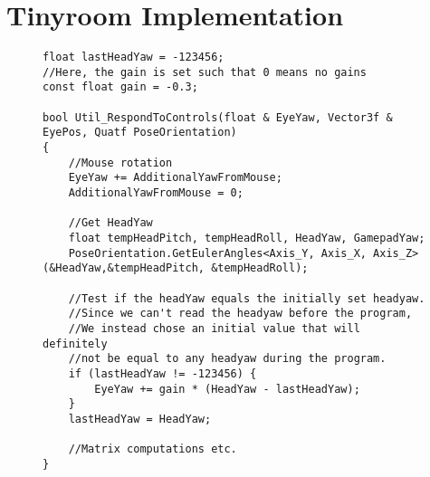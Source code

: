 \section{Tinyroom Implementation}
\lstset{language=C++}

\begin{figure}[h]
\begin{lstlisting}[breaklines=true]
float lastHeadYaw = -123456;
//Here, the gain is set such that 0 means no gains
const float gain = -0.3; 

bool Util_RespondToControls(float & EyeYaw, Vector3f & EyePos, Quatf PoseOrientation)
{
    //Mouse rotation
    EyeYaw += AdditionalYawFromMouse;
    AdditionalYawFromMouse = 0;

    //Get HeadYaw
    float tempHeadPitch, tempHeadRoll, HeadYaw, GamepadYaw;
    PoseOrientation.GetEulerAngles<Axis_Y, Axis_X, Axis_Z>(&HeadYaw,&tempHeadPitch, &tempHeadRoll);

    //Test if the headYaw equals the initially set headyaw.
    //Since we can't read the headyaw before the program,
    //We instead chose an initial value that will definitely
    //not be equal to any headyaw during the program.
	if (lastHeadYaw != -123456) {
		EyeYaw += gain * (HeadYaw - lastHeadYaw);
	}
	lastHeadYaw = HeadYaw;

    //Matrix computations etc.
}
\end{lstlisting}
\end{figure}
